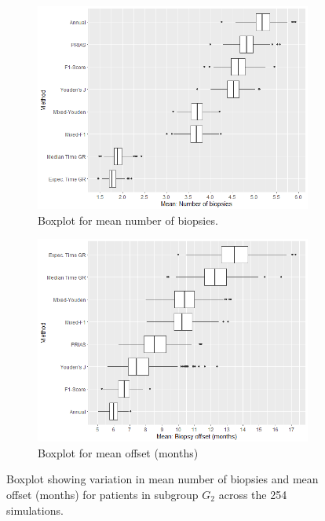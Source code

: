 \begin{figure}[!htb]
    \centering
    \captionsetup{justification=centering}
     \begin{subfigure}[b]{0.45\textwidth}
        \includegraphics[width=\textwidth]{images/sim_study/nbMeanBoxPlot_scale_5.png}
        \caption{Boxplot for mean number of biopsies.}
        \label{fig : nbMeanBoxPlot_G2}
    \end{subfigure}
    \begin{subfigure}[b]{0.45\textwidth}
        \includegraphics[width=\textwidth]{images/sim_study/offsetMeanBoxPlot_scale_5.png}
        \caption{Boxplot for mean offset (months)}
        \label{fig : offsetMeanBoxPlot_G2}
    \end{subfigure}      
    \caption{Boxplot showing variation in mean number of biopsies and mean offset (months) for patients in subgroup $G_2$ across the 254 simulations.}
    \label{fig : nbAndOffsetMeanBoxPlot_G2}
\end{figure}

